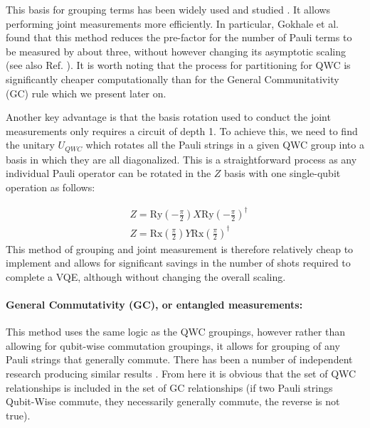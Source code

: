 This basis for grouping terms has been widely used and studied \cite{mccleanTheoryVariationalHybrid2015, Kandala2017, Hempel2018, Rubin2018, Kokail2019, Izmaylov2019, Nam2020, Verteletskyi2020, Hamamura2020, Gokhale2019_long}. It allows performing joint measurements more efficiently. In particular, Gokhale et al. \cite{Gokhale2019_long} found that this method reduces the pre-factor for the number of Pauli terms to be measured by about three, without however changing its asymptotic scaling (see also Ref. \cite{Yen2020}). It is worth noting that the process for partitioning for QWC is significantly cheaper computationally \cite{Gokhale2019_long} than for the General Communitativity (GC) rule which we present later on.

Another key advantage is that the basis rotation used to conduct the joint measurements only requires a circuit of depth 1. To achieve this, we need to find the unitary $U_{QWC}$ which rotates all the Pauli strings in a given QWC group into a basis in which they are all diagonalized. This is a straightforward process as any individual Pauli operator can be rotated in the $Z$ basis with one single-qubit operation as follows: 

\begin{align}
    &Z = \mathrm{Ry}\left(-\frac{\pi}{2}\right) X \mathrm{Ry}\left(-\frac{\pi}{2}\right)^{\dagger} \nonumber \\
    &Z = \mathrm{Rx}\left(\frac{\pi}{2}\right) Y \mathrm{Rx}\left(\frac{\pi}{2}\right)^{\dagger}
\end{align}
This method of grouping and joint measurement is therefore relatively cheap to implement and allows for significant savings in the number of shots required to complete a VQE, although without changing the overall scaling. 

\paragraph{General Commutativity (GC), or entangled measurements:} This method uses the same logic as the QWC groupings, however rather than allowing for qubit-wise commutation groupings, it allows for grouping of any Pauli strings that generally commute. There has been a number of independent research producing similar results \cite{Yen2020, Hamamura2020, Gokhale2019_short}. From here it is obvious that the set of QWC relationships is included in the set of GC relationships (if two Pauli strings Qubit-Wise commute, they necessarily generally commute, the reverse is not true). 

